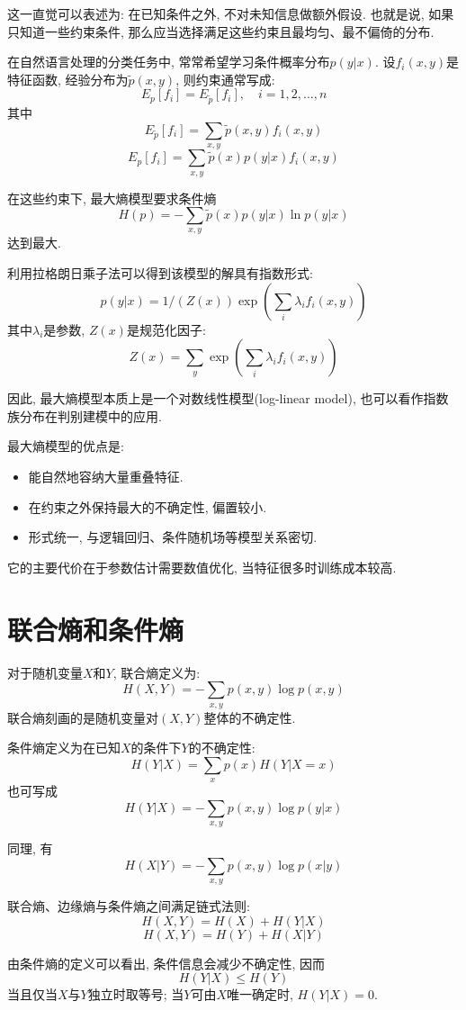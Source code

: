 这一直觉可以表述为: 在已知条件之外, 不对未知信息做额外假设.
也就是说, 如果只知道一些约束条件, 那么应当选择满足这些约束且最均匀、最不偏倚的分布.

在自然语言处理的分类任务中, 常常希望学习条件概率分布$p(y|x)$. 设$f_i (x,y)$是特征函数, 经验分布为$\tilde{p}(x,y)$, 则约束通常写成:
\[
E_p [f_i] = E_{\tilde{p}}[f_i], \quad i=1,2,\dots,n
\]
其中
\[
E_{\tilde{p}}[f_i] = \sum_{x,y} \tilde{p}(x,y) f_i( x,y)
\]
\[
E_p [f_i] = \sum_{x,y} \tilde{p}(x) p(y|x) f_i (x,y)
\]

在这些约束下, 最大熵模型要求条件熵
\[
H(p) = - \sum_{x,y} \tilde{p}(x) p(y|x) \ln p(y|x)
\]
达到最大.

利用拉格朗日乘子法可以得到该模型的解具有指数形式:
\[
p(y|x) = 1/(Z(x)) \exp(\sum_i \lambda_i f_i(x,y))
\]
其中$\lambda_i$是参数, $Z(x)$是规范化因子:
\[
Z(x) = \sum_y \exp(\sum_i \lambda_i f_i(x,y))
\]

因此, 最大熵模型本质上是一个对数线性模型(log-linear model), 也可以看作指数族分布在判别建模中的应用.

最大熵模型的优点是:

\begin{itemize}
\item 能自然地容纳大量重叠特征.
\item 在约束之外保持最大的不确定性, 偏置较小.
\item 形式统一, 与逻辑回归、条件随机场等模型关系密切.
\end{itemize}

它的主要代价在于参数估计需要数值优化, 当特征很多时训练成本较高.

\section{联合熵和条件熵}


对于随机变量$X$和$Y$, 联合熵定义为:
\[
H(X,Y) = - \sum_{x,y} p(x,y) \log p(x,y)
\]
联合熵刻画的是随机变量对$(X,Y)$整体的不确定性.

条件熵定义为在已知$X$的条件下$Y$的不确定性:
\[
H(Y|X) = \sum_x p(x)H(Y|X=x)
\]
也可写成
\[
H(Y|X) = - \sum_{x,y} p(x,y) \log p(y|x)
\]

同理, 有
\[
H(X|Y) = - \sum_{x,y} p(x,y) \log p(x|y)
\]

联合熵、边缘熵与条件熵之间满足链式法则:
\[
H(X,Y) = H(X) + H(Y|X)
\]
\[
H(X,Y) = H(Y) + H(X|Y)
\]

由条件熵的定义可以看出, 条件信息会减少不确定性, 因而
\[
H(Y|X) \le H(Y)
\]
当且仅当$X$与$Y$独立时取等号; 当$Y$可由$X$唯一确定时, $H(Y|X)=0$.

